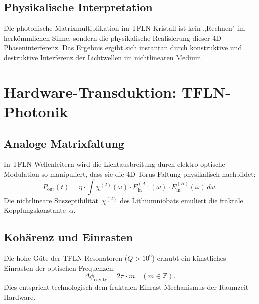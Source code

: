 \subsection{Physikalische Interpretation}

Die photonische Matrixmultiplikation im TFLN-Kristall ist kein „Rechnen"
im herkömmlichen Sinne, sondern die physikalische Realisierung dieser
4D-Phaseninterferenz. Das Ergebnis ergibt sich instantan durch konstruktive
und destruktive Interferenz der Lichtwellen im nichtlinearen Medium.

\section{Hardware-Transduktion: TFLN-Photonik}

\subsection{Analoge Matrixfaltung}

In TFLN-Wellenleitern wird die Lichtausbreitung durch elektro-optische
Modulation so manipuliert, dass sie die 4D-Torus-Faltung physikalisch
nachbildet:
\begin{equation}
  P_{\text{out}}(t)
  = \eta \cdot \int \chi^{(2)}(\omega)
    \cdot E_{\text{in}}^{(A)}(\omega)
    \cdot E_{\text{in}}^{(B)}(\omega)\,d\omega.
\end{equation}
Die nichtlineare Suszeptibilität~$\chi^{(2)}$ des Lithiumniobats emuliert
die fraktale Kopplungskonstante~$\alpha$.

\subsection{Kohärenz und Einrasten}

Die hohe Güte der TFLN-Resonatoren ($Q > 10^6$) erlaubt ein künstliches
Einrasten der optischen Frequenzen:
\begin{equation}
  \Delta\phi_{\text{cavity}} = 2\pi\cdot m \quad (m \in \mathbb{Z}).
\end{equation}
Dies entspricht technologisch dem fraktalen Einrast-Mechanismus der
Raumzeit-Hardware.

